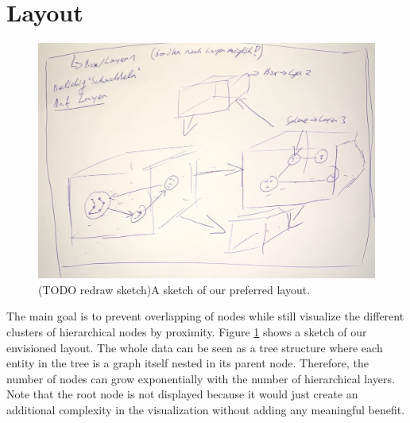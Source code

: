 
\section{Layout}
\label{chap:ps-layout}

\begin{figure}[h]
    \centering
    \includegraphics[width=1\textwidth]{chapters/graphics/concept1.jpg}
    \caption{(TODO redraw sketch)A sketch of our preferred layout. } 
    \label{fig:layoutSketch} 
\end{figure}

The main goal is to prevent overlapping of nodes while still visualize the different clusters of hierarchical nodes by proximity. Figure \ref{fig:layoutSketch} shows a sketch of our envisioned layout. The whole data can be seen as a tree structure where each entity in the tree is a graph itself nested in its parent node. Therefore, the number of nodes can grow exponentially with the number of hierarchical layers. Note that the root node is not displayed because it would just create an additional complexity in the visualization without adding any meaningful benefit.

